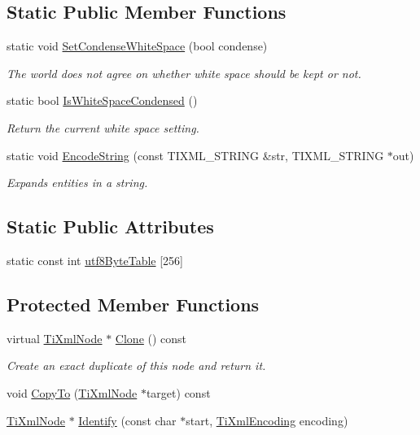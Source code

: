 \subsection*{Static Public Member Functions}
\begin{DoxyCompactItemize}
\item 
static void \hyperlink{classTiXmlBase_a0f799ec645bfb8d8a969e83478f379c1}{SetCondenseWhiteSpace} (bool condense)
\begin{DoxyCompactList}\small\item\em The world does not agree on whether white space should be kept or not. \item\end{DoxyCompactList}\item 
static bool \hyperlink{classTiXmlBase_ad4b1472531c647a25b1840a87ae42438}{IsWhiteSpaceCondensed} ()
\begin{DoxyCompactList}\small\item\em Return the current white space setting. \item\end{DoxyCompactList}\item 
static void \hyperlink{classTiXmlBase_a32ed202562b58de64c7d799ca3c9db98}{EncodeString} (const TIXML\_\-STRING \&str, TIXML\_\-STRING $\ast$out)
\begin{DoxyCompactList}\small\item\em Expands entities in a string. \item\end{DoxyCompactList}\end{DoxyCompactItemize}
\subsection*{Static Public Attributes}
\begin{DoxyCompactItemize}
\item 
static const int \hyperlink{classTiXmlBase_ac8c86058137bdb4b413c3eca58f2d467}{utf8ByteTable} \mbox{[}256\mbox{]}
\end{DoxyCompactItemize}
\subsection*{Protected Member Functions}
\begin{DoxyCompactItemize}
\item 
virtual \hyperlink{classTiXmlNode}{TiXmlNode} $\ast$ \hyperlink{classTiXmlDocument_ac9e8f09b23454d953b32d1b65cd1409e}{Clone} () const 
\begin{DoxyCompactList}\small\item\em Create an exact duplicate of this node and return it. \item\end{DoxyCompactList}\item 
void \hyperlink{classTiXmlNode_ab6056978923ad8350fb5164af32d8038}{CopyTo} (\hyperlink{classTiXmlNode}{TiXmlNode} $\ast$target) const 
\item 
\hyperlink{classTiXmlNode}{TiXmlNode} $\ast$ \hyperlink{classTiXmlNode_ac1e3a8e7578be463b04617786120c2bb}{Identify} (const char $\ast$start, \hyperlink{tinyxml_8h_a88d51847a13ee0f4b4d320d03d2c4d96}{TiXmlEncoding} encoding)
\end{DoxyCompactItemize}
